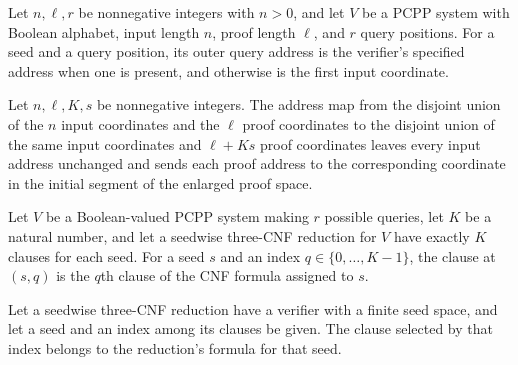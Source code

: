 \begin{definition}
\label{FABL.outerQueryAddress}
\leanok
{}
Let $n,\ell,r$ be nonnegative integers with $n>0$, and let $V$ be a PCPP system with
Boolean alphabet, input length $n$, proof length $\ell$, and $r$ query positions. For a
seed and a query position, its outer query address is the verifier’s specified address
when one is present, and otherwise is the first input coordinate.
\end{definition}

\begin{definition}
\label{FABL.liftOuterAddress}
\leanok
Let $n,\ell,K,s$ be nonnegative integers. The address map from the disjoint union of the
$n$ input coordinates and the $\ell$ proof coordinates to the disjoint union of the same
input coordinates and $\ell+Ks$ proof coordinates leaves every input address unchanged
and sends each proof address to the corresponding coordinate in the initial segment of
the enlarged proof space.
\end{definition}

\begin{definition}
\label{FABL.SeedwiseThreeCNFReduction.clause}
\leanok
{}
Let $V$ be a Boolean-valued PCPP system making $r$ possible queries, let $K$ be a
natural number, and let a seedwise three-CNF reduction for $V$ have exactly $K$ clauses
for each seed. For a seed $s$ and an index $q\in\{0,\ldots,K-1\}$, the clause at $(s,q)$
is the $q$th clause of the CNF formula assigned to $s$.
\end{definition}

\begin{theorem}
\label{FABL.SeedwiseThreeCNFReduction.clause_mem}
\leanok
{}
Let a seedwise three-CNF reduction have a verifier with a finite seed space, and let a
seed and an index among its clauses be given. The clause selected by that index belongs
to the reduction's formula for that seed.
\end{theorem}

